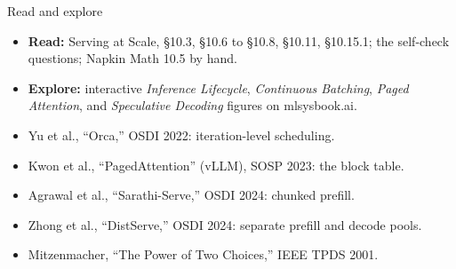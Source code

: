 \documentclass[aspectratio=169, 12pt]{beamer}
\begin{document}
\begin{frame}{Read and explore}
  \small
  \begin{itemize}\setlength{\itemsep}{0.02cm}
    \item \textbf{Read:} Serving at Scale, \S10.3, \S10.6 to \S10.8, \S10.11, \S10.15.1; the self-check questions; Napkin Math 10.5 by hand.
    \item \textbf{Explore:} interactive \emph{Inference Lifecycle}, \emph{Continuous Batching}, \emph{Paged Attention}, and \emph{Speculative Decoding} figures on mlsysbook.ai.
    \item Yu et al., ``Orca,'' OSDI 2022: iteration-level scheduling.
    \item Kwon et al., ``PagedAttention'' (vLLM), SOSP 2023: the block table.
    \item Agrawal et al., ``Sarathi-Serve,'' OSDI 2024: chunked prefill.
    \item Zhong et al., ``DistServe,'' OSDI 2024: separate prefill and decode pools.
    \item Mitzenmacher, ``The Power of Two Choices,'' IEEE TPDS 2001.
  \end{itemize}
\end{frame}
\end{document}
